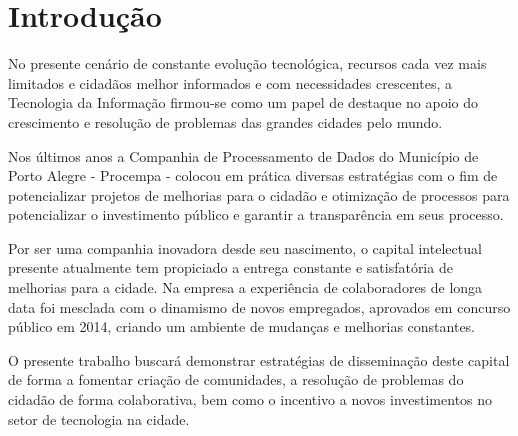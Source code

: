 \chapter{Introdução}

No presente cenário de constante evolução tecnológica, recursos cada vez mais limitados e cidadãos melhor informados e com necessidades crescentes, a Tecnologia da Informação firmou-se como um papel de destaque no apoio do crescimento e resolução de problemas das grandes cidades pelo mundo.


Nos últimos anos a Companhia de Processamento de Dados do Município de Porto Alegre - Procempa - colocou em prática diversas estratégias com o fim de potencializar projetos de melhorias para o cidadão e otimização de processos para potencializar o investimento público e garantir a transparência em seus processo.


Por ser uma companhia inovadora desde seu nascimento, o capital intelectual presente atualmente tem propiciado a entrega constante e satisfatória de melhorias para a cidade. Na empresa a experiência de colaboradores de longa data foi mesclada com o dinamismo de novos empregados, aprovados em concurso público em 2014, criando um ambiente de mudanças e melhorias constantes.


O presente trabalho buscará demonstrar estratégias de disseminação deste capital de forma a fomentar criação de comunidades, a resolução de problemas do cidadão de forma colaborativa, bem como o incentivo a novos investimentos no setor de tecnologia na cidade.
